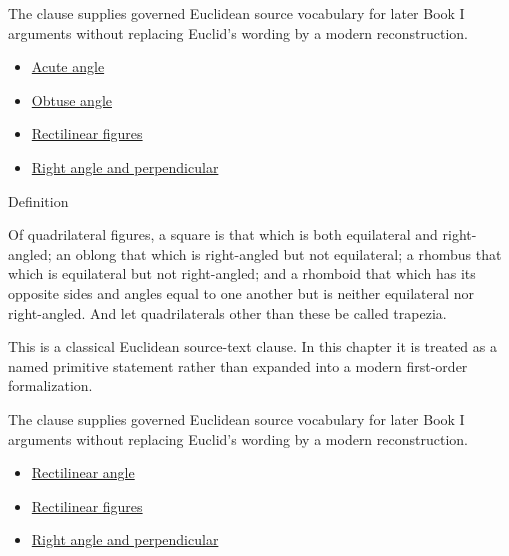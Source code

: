 \begin{remark*}[Interpretation]
The clause supplies governed Euclidean source vocabulary for later Book I
arguments without replacing Euclid's wording by a modern reconstruction.
\end{remark*}

\begin{lra-not-visible}
\begin{dependencies}
\begin{itemize}
  \item \hyperref[def:euclid-acute-angle]{Acute angle}
  \item \hyperref[def:euclid-obtuse-angle]{Obtuse angle}
  \item \hyperref[def:euclid-rectilinear-figures]{Rectilinear figures}
  \item \hyperref[def:euclid-right-angle-and-perpendicular]{Right angle and perpendicular}
\end{itemize}
\end{dependencies}
\end{lra-not-visible}

\begin{definitionbox}{Definition}
\begin{definition}
\label{def:euclid-quadrilateral-classes}
Of quadrilateral figures, a square is that which is both equilateral and
right-angled; an oblong that which is right-angled but not equilateral; a
rhombus that which is equilateral but not right-angled; and a rhomboid that
which has its opposite sides and angles equal to one another but is neither
equilateral nor right-angled. And let quadrilaterals other than these be called
trapezia.
\end{definition}
\end{definitionbox}
\begin{remark*}
This is a classical Euclidean source-text clause. In this chapter it is treated
as a named primitive statement rather than expanded into a modern first-order
formalization.
\end{remark*}

\begin{remark*}[Interpretation]
The clause supplies governed Euclidean source vocabulary for later Book I
arguments without replacing Euclid's wording by a modern reconstruction.
\end{remark*}

\begin{lra-not-visible}
\begin{dependencies}
\begin{itemize}
  \item \hyperref[def:euclid-rectilinear-angle]{Rectilinear angle}
  \item \hyperref[def:euclid-rectilinear-figures]{Rectilinear figures}
  \item \hyperref[def:euclid-right-angle-and-perpendicular]{Right angle and perpendicular}
\end{itemize}
\end{dependencies}
\end{lra-not-visible}

